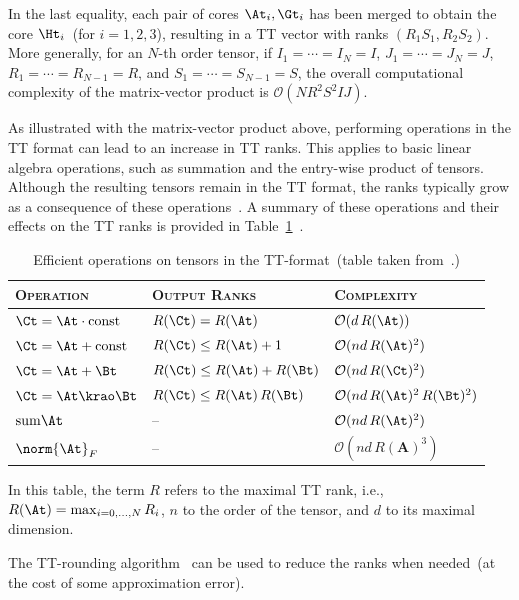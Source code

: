 In the last equality, each pair of cores $\At_i,\Gt_i$ has been merged to obtain the core $\Ht_i$~(for $i = 1,2,3$), resulting in a  TT vector with ranks $(R_1 S_1, R_2 S_2)$. More generally, for an $N$-th order tensor, if $I_1 = \cdots = I_N = I$, $J_1 = \cdots = J_N = J$, $R_1 = \cdots = R_{N-1} = R$, and $S_1 = \cdots = S_{N-1} = S$, the overall computational complexity of the matrix-vector product is $\mathcal{O}(N R^2 S^2 I J)$.

As illustrated with the matrix-vector product above, performing operations in the TT format can lead to an increase in TT ranks. This applies to basic linear algebra operations, such as summation and the entry-wise product of
tensors. Although the resulting tensors remain in the TT format, the ranks typically grow as a consequence of these operations~\citep{oseledets2010approximation}. A summary of these operations and their effects on the TT ranks is provided in Table~\ref{tab:tt-operations}~\citep{novikov2014putting}. 
\begin{table}
\centering
\begin{tabular}{lll}
\toprule
\textsc{Operation} & \textsc{Output Ranks} & \textsc{Complexity} \\
\midrule
$\Ct = \At \cdot \text{const}$ & $R(\Ct) = R(\At)$ & $\mathcal{O}(d\,R(\At))$ \\
$\Ct = \At + \text{const}$ & $R(\Ct) \leq R(\At) + 1$ & $\mathcal{O}(nd\,R(\At)^2)$ \\
$\Ct = \At + \Bt$ & $R(\Ct) \leq R(\At) + R(\Bt)$ & $\mathcal{O}(nd\,R(\Ct)^2)$ \\
$\Ct = \At \krao \Bt$ & $R(\Ct) \leq R(\At)\,R(\Bt)$ & $\mathcal{O}(nd\,R(\At)^2\,R(\Bt)^2)$ \\
$\mathrm{sum} \At$ & -- & $\mathcal{O}(nd\,R(\At)^2)$ \\
$\norm{\At}_F$ & -- & $\mathcal{O}(nd\,R(\mathbf{A})^3)$ \\
\bottomrule
\end{tabular}
\caption{ Efficient operations on tensors in the TT-format~(table taken from~\citep{novikov2014putting}.)}
\label{tab:tt-operations}
\end{table}
In this table, the term $R$ refers to the maximal TT rank, i.e., $R(\At) = \max_{i=0,\dots,N} R_i$, $n$ to the order of the tensor, and $d$ to its maximal dimension.

The TT-rounding algorithm~\citep{oseledets2010approximation} can be used to reduce the ranks when needed~(at the cost of some approximation error). 

